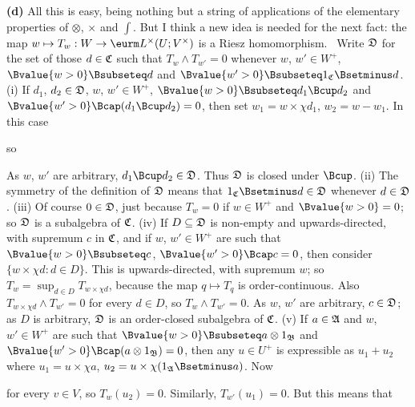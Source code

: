 {{\bf (d)} All this is easy, being nothing but a string of applications
of the elementary properties of $\otimes$, $\times$ and $\int$.   But I
think a new idea is needed for the next fact:  the map $w\mapsto
T_w:W\to\eurm L^{\times}(U;V^{\times})$ is a Riesz homomorphism.   \Prf\
Write $\frak D$ for the set of those $d\in\frak C$ such that $T_w\wedge
T_{w'}=0$ whenever $w$, $w'\in W^+$, $\Bvalue{w>0}\Bsubseteq d$ and
$\Bvalue{w'>0}\Bsubseteq 1_{\frak C}\Bsetminus d$.
(i) If $d_1$, $d_2\in \frak D$, $w$, $w'\in W^+$,
$\Bvalue{w>0}\Bsubseteq d_1\Bcup d_2$ and $\Bvalue{w'>0}\Bcap(d_1\Bcup
d_2)=0$, then set $w_1=w\times\chi d_1$, $w_2=w-w_1$.   In this case


\noindent so


\noindent As $w$, $w'$ are arbitrary, $d_1\Bcup d_2\in \frak D$.   Thus
$\frak D$ is closed under $\Bcup$.   (ii) The symmetry of the definition
of $\frak D$ means that $1_{\frak C}\Bsetminus d\in \frak D$ whenever
$d\in \frak D$.   (iii) Of course $0\in \frak D$, just because $T_w=0$
if $w\in W^+$ and $\Bvalue{w>0}=0$;  so $\frak D$ is a subalgebra of
$\frak C$.   (iv) If $D\subseteq \frak D$ is non-empty and
upwards-directed, with supremum $c$ in $\frak C$, and if $w$, $w'\in
W^+$ are such that $\Bvalue{w>0}\Bsubseteq c$, $\Bvalue{w'>0}\Bcap c=0$,
then consider $\{w\times\chi d:d\in D\}$.   This is upwards-directed,
with supremum $w$;  so $T_w=\sup_{d\in D}T_{w\times\chi d}$, because the
map $q\mapsto T_q$ is order-continuous.   Also $T_{w\times\chi d}\wedge
T_{w'}=0$ for every $d\in D$, so $T_w\wedge T_{w'}=0$.   As $w$, $w'$
are arbitrary, $c\in\frak D$;  as $D$ is arbitrary, $\frak D$ is an
order-closed subalgebra of $\frak C$.   (v) If $a\in\frak A$ and $w$,
$w'\in W^+$ are such that $\Bvalue{w>0}\Bsubseteq a\otimes 1_{\frak B}$ and
$\Bvalue{w'>0}\Bcap(a\otimes 1_{\frak B})=0$, then any $u\in U^+$ is
expressible as $u_1+u_2$ where $u_1=u\times\chi a$,
$u_2=u\times\chi(1_{\frak A}\Bsetminus a)$.   Now


\noindent for every $v\in V$, so $T_w(u_2)=0$.   Similarly,
$T_{w'}(u_1)=0$.   But this means that

}
